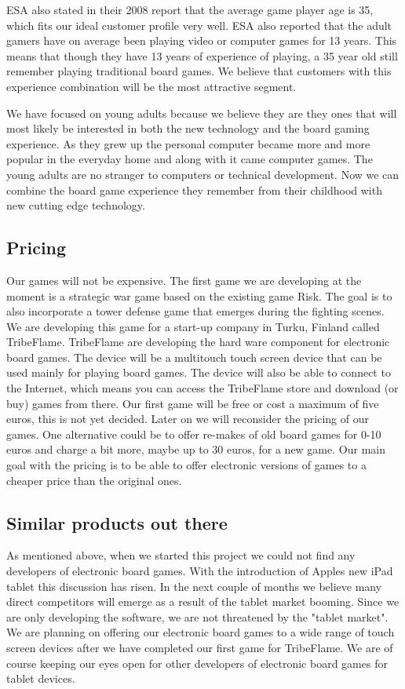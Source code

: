 \documentclass[12pt,a4paper]{article}
\begin{document}
ESA also stated in their 2008 report that the average game player age is 35, which fits our ideal customer profile very well. ESA also reported that the adult gamers have on average been playing video or computer games for 13 years. This means that though they have 13 years of experience of playing, a 35 year old still remember playing traditional board games. We believe that customers with this experience combination will be the most attractive segment.

We have focused on young adults because we believe they are they ones that will most likely be interested in both the new technology and the board gaming experience. As they grew up the personal computer became more and more popular in the everyday home and along with it came computer games. The young adults are no stranger to computers or technical development. Now we can combine the board game experience they remember from their childhood with new cutting edge technology.

\subsection{Pricing}
Our games will not be expensive. The first game we are developing at the moment is a strategic war game based on the existing game Risk. The goal is to also incorporate a tower defense game that emerges during the fighting scenes. We are developing this game for a start-up company in Turku, Finland called TribeFlame. TribeFlame are developing the hard ware component for electronic board games. The device will be a multitouch touch screen device that can be used mainly for playing board games. The device will also be able to connect to the Internet, which means you can access the TribeFlame store and download (or buy) games from there. Our first game will be free or cost a maximum of five euros, this is not yet decided. Later on we will reconsider the pricing of our games. One alternative could be to offer re-makes of old board games for 0-10 euros and charge a bit more, maybe up to 30 euros, for a new game. Our main goal with the pricing is to be able to offer electronic versions of games to a cheaper price than the original ones.

\subsection{Similar products out there}
As mentioned above, when we started this project we could not find any developers of electronic board games. With the introduction of Apples new iPad tablet this discussion has risen. In the next couple of months we believe many direct competitors will emerge as a result of the tablet market booming. Since we are only developing the software, we are not threatened by the "tablet market". We are planning on offering our electronic board games to a wide range of touch screen devices after we have completed our first game for TribeFlame. We are of course keeping our eyes open for other developers of electronic board games for tablet devices.
\end{document}
